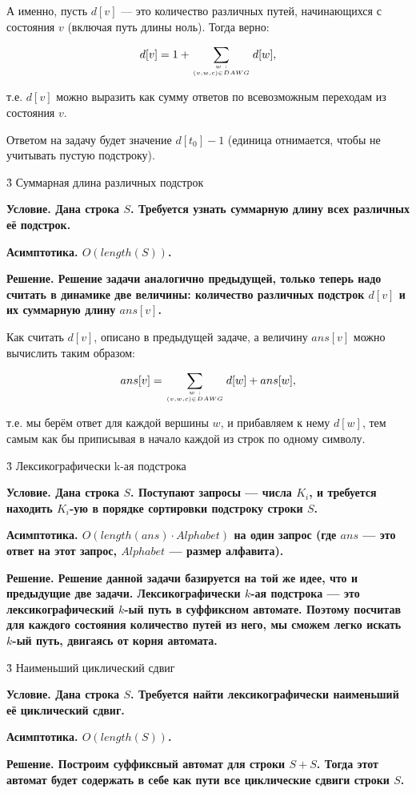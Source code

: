 А именно, пусть $d[v]$ --- это количество различных путей, начинающихся с состояния $v$ (включая путь длины ноль). Тогда верно:

$$ d[v] = 1 + \sum_{w ~ : \atop (v,w,c) \in DAWG} d[w], $$

т.е. $d[v]$ можно выразить как сумму ответов по всевозможным переходам из состояния $v$.

Ответом на задачу будет значение $d[t_0]-1$ (единица отнимается, чтобы не учитывать пустую подстроку).


\h3{ Суммарная длина различных подстрок }

\bf{Условие}. Дана строка $S$. Требуется узнать суммарную длину всех различных её подстрок.

\bf{Асимптотика}. $O (length (S))$.

\bf{Решение}. Решение задачи аналогично предыдущей, только теперь надо считать в динамике две величины: количество различных подстрок $d[v]$ и их суммарную длину $ans[v]$.

Как считать $d[v]$, описано в предыдущей задаче, а величину $ans[v]$ можно вычислить таким образом:

$$ ans[v] = \sum_{w ~ : \atop (v,w,c) \in DAWG} d[w] + ans[w], $$

т.е. мы берём ответ для каждой вершины $w$, и прибавляем к нему $d[w]$, тем самым как бы приписывая в начало каждой из строк по одному символу.


\h3{ Лексикографически k-ая подстрока }

\bf{Условие}. Дана строка $S$. Поступают запросы --- числа $K_i$, и требуется находить $K_i$-ую в порядке сортировки подстроку строки $S$.

\bf{Асимптотика}. $O (length (ans) \cdot Alphabet)$ на один запрос (где $ans$ --- это ответ на этот запрос, $Alphabet$ --- размер алфавита).

\bf{Решение}. Решение данной задачи базируется на той же идее, что и предыдущие две задачи. Лексикографически $k$-ая подстрока --- это лексикографический $k$-ый путь в суффиксном автомате. Поэтому посчитав для каждого состояния количество путей из него, мы сможем легко искать $k$-ый путь, двигаясь от корня автомата.


\h3{ Наименьший циклический сдвиг }

\bf{Условие}. Дана строка $S$. Требуется найти лексикографически наименьший её циклический сдвиг.

\bf{Асимптотика}. $O (length (S))$.

\bf{Решение}. Построим суффиксный автомат для строки $S+S$. Тогда этот автомат будет содержать в себе как пути все циклические сдвиги строки $S$.

